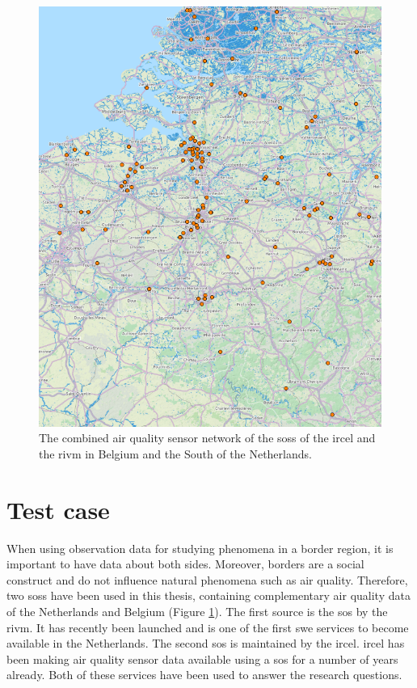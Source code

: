 \begin{figure}
	\centering
	\includegraphics[width=\linewidth]{figs/combined.png}
	\caption{The combined air quality sensor network of the \aclp*{sos} of the \acf*{ircel} and the \acf*{rivm} in Belgium and the South of the Netherlands.}
	\label{fig:combined}
\end{figure}

\section{Test case}
When using observation data for studying phenomena in a border region, it is important to have data about both sides. Moreover, borders are a social construct and do not influence natural phenomena such as air quality. Therefore, two \aclp{sos} have been used in this thesis, containing complementary air quality data of the Netherlands and Belgium (Figure \ref{fig:combined}). The first source is the \ac{sos} by the \ac{rivm}. It has recently been launched and is one of the first \ac{swe} services to become available in the Netherlands. The second \ac{sos} is maintained by the \acf{ircel}. \ac{ircel} has been making air quality sensor data available using a \ac{sos} for a number of years already. Both of these services have been used to answer the research questions.


